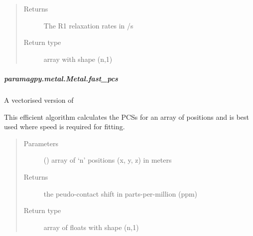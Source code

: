 \documentclass[a4paper,10pt,english,openany,oneside]{sphinxmanual}
\begin{document}
\begin{fulllineitems}
\begin{fulllineitems}
\begin{fulllineitems}
\begin{quote}
\begin{description}
\begin{itemize}
\end{itemize}

\item[{Returns}] \leavevmode
{} \textendash{} The R1 relaxation rates in /s

\item[{Return type}] \leavevmode
array with shape (n,1)

\end{description}\end{quote}

\end{fulllineitems}



\subparagraph{paramagpy.metal.Metal.fast\_pcs}
\label{\detokenize{reference/generated/paramagpy.metal.Metal.fast_pcs:paramagpy-metal-metal-fast-pcs}}\label{\detokenize{reference/generated/paramagpy.metal.Metal.fast_pcs::doc}}

\begin{fulllineitems}
\label{\detokenize{reference/generated/paramagpy.metal.Metal.fast_pcs:paramagpy.metal.Metal.fast_pcs}}
A vectorised version of {\hyperref[\detokenize{reference/generated/paramagpy.metal.Metal.pcs:paramagpy.metal.Metal.pcs}]{}}

This efficient algorithm calculates the PCSs for an array of
positions and is best used where speed is required for fitting.
\begin{quote}\begin{description}
\item[{Parameters}] \leavevmode
{} (\sphinxstyleliteralemphasis{\sphinxupquote{ (}}\sphinxstyleliteralemphasis{\sphinxupquote{,}}\sphinxstyleliteralemphasis{\sphinxupquote{)}}) \textendash{} array of ‘n’ positions (x, y, z) in meters

\item[{Returns}] \leavevmode
{} \textendash{} the peudo-contact shift in parts-per-million (ppm)

\item[{Return type}] \leavevmode
array of floats with shape (n,1)


\end{description}
\end{quote}
\end{fulllineitems}
\end{fulllineitems}
\end{fulllineitems}
\end{document}
